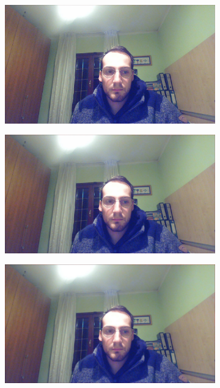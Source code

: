 \documentclass[paper=a4, fontsize=10pt]{scrartcl}	%
\begin{document}
	\begin{figure}[H]
		\centering
		\begin{subfigure}{0.2\textwidth}
			\includegraphics[width=\linewidth]{images/heatmap/img_mean/img_man3.jpg}
		\end{subfigure}%
		\begin{subfigure}{0.2\textwidth}
			\includegraphics[width=\linewidth]{images/heatmap/img_mean/img_man5.jpg}
		\end{subfigure}%
		\begin{subfigure}{0.2\textwidth}
			\includegraphics[width=\linewidth]{images/heatmap/img_mean/img_man7.jpg}

\end{subfigure}
\end{figure}
\end{document}
